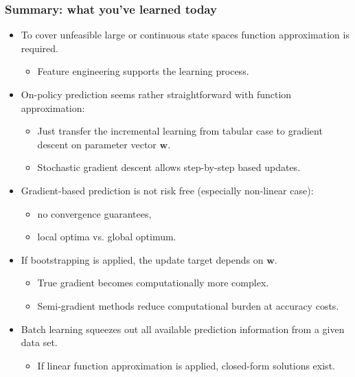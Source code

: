 \begin{frame}
	\frametitle{Summary: what you've learned today}
	\begin{itemize}
		\item To cover unfeasible large or continuous state spaces function approximation is required.
		      \begin{itemize}\pause
			      \item Feature engineering supports the learning process.\pause
		      \end{itemize}
		\item On-policy prediction seems rather straightforward with function approximation:
		      \begin{itemize}
			      \item Just transfer the incremental learning from tabular case to gradient descent on parameter vector $\bm{w}$.\pause
			      \item Stochastic gradient descent allows step-by-step based updates.\pause
		      \end{itemize}
		\item Gradient-based prediction is not risk free (especially non-linear case):
		      \begin{itemize}
			      \item no convergence guarantees,
			      \item local optima vs. global optimum.
		      \end{itemize}\pause
		\item If bootstrapping is applied, the update target depends on $\bm{w}$.
		      \begin{itemize}
			      \item True gradient becomes computationally more complex.\pause
			      \item Semi-gradient methods reduce computational burden at accuracy costs.\pause
		      \end{itemize}
		\item Batch learning squeezes out all available prediction information from a given data set.\pause
		      \begin{itemize}
			      \item If linear function approximation is applied, closed-form solutions exist.
		      \end{itemize}
	\end{itemize}
\end{frame}